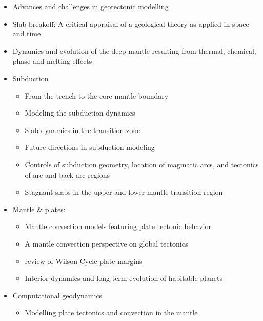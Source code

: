 \begin{itemize}
\item Advances and challenges in geotectonic modelling \cite{bufy14}
\item Slab breakoff: A critical appraisal of a geological theory as applied in space and time \cite{garm18}
\item Dynamics and evolution of the deep mantle resulting from thermal, chemical, phase and melting effects \cite{tack12}

\item Subduction
   \begin{itemize}
   \item From the trench to the core-mantle boundary \cite{kinc95}
   \item Modeling the subduction dynamics \cite{bill08}
   \item Slab dynamics in the transition zone \cite{bill10}
   \item Future directions in subduction modeling \cite{gery11}
   \item Controls of subduction geometry, location of magmatic arcs, 
         and tectonics of arc and back-arc regions \cite{crpi82}
   \item Stagnant slabs in the upper and lower mantle transition region \cite{fuwo01}
   \end{itemize}

\item Mantle \& plates:
   \begin{itemize}
   \item Mantle convection models featuring plate tectonic behavior \cite{lowm11}
   \item A mantle convection perspective on global tectonics \cite{cogu17}
   \item review of Wilson Cycle plate margins \cite{buto14}
   \item Interior dynamics and long term evolution of habitable planets \cite{taab12}
   \end{itemize}

\item Computational geodynamics
   \begin{itemize}
   \item Modelling plate tectonics and convection in the mantle \cite{mogz00}
   \end{itemize}


\end{itemize}
